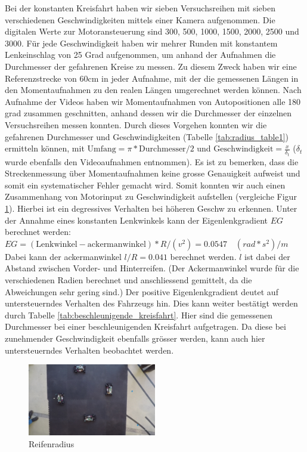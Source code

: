 \documentclass[10pt]{article}
\begin{document}
    Bei der konstanten Kreisfahrt haben wir sieben Versuchsreihen mit sieben verschiedenen Geschwindigkeiten mittels einer Kamera aufgenommen.
    Die digitalen Werte zur Motoransteuerung sind 300, 500, 1000, 1500, 2000, 2500 und 3000.
    Für jede Geschwindigkeit haben wir mehrer Runden mit konstantem Lenkeinschlag von 25 Grad aufgenommen, um anhand der Aufnahmen die Durchmesser der gefahrenen Kreise zu messen.
    Zu diesem Zweck haben wir eine Referenzstrecke von 60cm in jeder Aufnahme, mit der die gemessenen Längen in den Momentaufnahmen zu den
    realen Längen umgerechnet werden können. Nach Aufnahme der Videos haben wir Momentaufnahmen von Autopositionen alle 180 grad zusammen geschnitten,
    anhand dessen wir die Durchmesser der einzelnen Versuchsreihen messen konnten. Durch dieses Vorgehen konnten wir die gefahrenen Durchmesser und Geschwindigkeiten (Tabelle \ref{tab:radius_table1}) ermitteln können, mit $\text{Umfang} = \pi*\text{Durchmesser}/2$ und $\text{Geschwindigkeit} = \frac{x}{\delta_t}$ ($\delta_t$ wurde ebenfalls den Videoaufnahmen entnommen).
    Es ist zu bemerken, dass die Streckenmessung über Momentaufnahmen keine grosse Genauigkeit aufweist und somit ein systematischer Fehler gemacht wird.
    Somit konnten wir auch einen Zusammenhang von Motorinput zu Geschwindigkeit aufstellen (vergleiche Figur \ref{fig:reifenradius}). Hierbei ist ein degressives Verhalten bei höheren Geschw zu erkennen.
    Unter der Annahme eines konstanten Lenkwinkels kann der Eigenlenkgradient $EG$ berechnet werden:
    $EG=(\text{Lenkwinkel}-\text{ackermanwinkel})*R/(v^2)=0.0547\quad (rad*s^2)/m$
    Dabei kann der ackermanwinkel  $l/R = 0.041$ berechnet werden. $l$ ist dabei der Abstand zwischen Vorder- und Hinterreifen.
    (Der Ackermanwinkel wurde für die verschiedenen Radien berechnet und anschliessend gemittelt, da die Abweichungen sehr gering sind.)
    Der positive Eigenlenkgradient deutet auf untersteuerndes Verhalten des Fahrzeugs hin. Dies kann weiter bestätigt werden durch Tabelle \ref{tab:beschleunigende_kreisfahrt}.
    Hier sind die gemessenen Durchmesser bei einer beschleunigenden Kreisfahrt aufgetragen. Da diese bei zunehmender Geschwindigkeit ebenfalls grösser werden, kann auch hier untersteuerndes Verhalten beobachtet werden.
\begin{figure}[hbtp]
        \centering
        \includegraphics[width=0.5\textwidth]{Dyn_Kreis_5678}
        \caption{Reifenradius}
        \label{fig:reifenradius}
    \end{figure}
\end{document}
